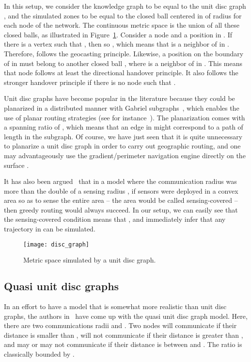 \documentclass{article}
\begin{document}
In this setup, we consider the knowledge graph  to be equal to the unit disc graph , and the simulated zones  to be equal to the closed ball
  centered in  of radius  for each node  of the network. The continuous metric space  is the union of all these closed balls, as illustrated in Figure~\ref{fig_disc_graph}.
Consider a node  and a position  in . If there is a vertex  such that , then  so , which means that  is a neighbor of  in . Therefore,  follows the geocasting principle. Likewise, a position  on the boundary of  in  must belong to another closed ball , where  is a neighbor of  in . This means that node  follows at least the directional handover principle. It also follows the stronger handover principle if there is no node  such that .

Unit disc graphs have become popular in the literature because they could be planarized in a distributed manner with Gabriel subgraphs~\cite{bib_gabriel}, which enables the use of planar routing strategies (see for instance~\cite{bib_gfg,bib_gpsr}). The planarization comes with a spanning ratio of , which means that an edge in  might correspond to a path of length  in the subgraph. Of course, we have just seen that it is quite unnecessary to planarize a unit disc graph in order to carry out geographic routing, and one may advantageously use the gradient/perimeter navigation engine directly on the surface .

It has also been argued~\cite{bib_sensing} that in a model where the communication radius  was more than the double of a sensing radius , if sensors were deployed in a convex area  so as to sense the entire area -- the area would be called sensing-covered -- then greedy routing would always succeed. In our setup, we can easily see that the sensing-covered condition means that , and immediately infer that any trajectory in  can be simulated.

\begin{figure}[h]
\begin{center}
\texttt{[image: disc\_graph]}
\caption{Metric space simulated by a unit disc graph.}
\label{fig_disc_graph}
\end{center}
\end{figure}

\subsection{Quasi unit disc graphs}
\label{sub_quasi}
In an effort to have a model that is somewhat more realistic than unit disc graphs, the authors in~\cite{bib_quasi_udg} have come up with the quasi unit disc graph model. Here, there are two communications radii  and . Two nodes will communicate if their distance is smaller than , will not communicate if their distance is greater than , and may or may not communicate if their distance is between  and . The ratio  is classically bounded by .
\end{document}

